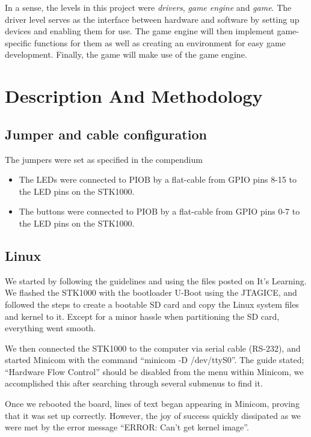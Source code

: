 \documentclass[a4paper,12pt]{article}
\begin{document}
In a sense, the levels in this project were \emph{drivers}, \emph{game engine} and \emph{game}. The driver level serves as the interface between hardware and software by setting up devices and enabling them for use. The game engine will then implement game-specific functions for them as well as creating an environment for easy game development. Finally, the game will make use of the game engine.

\clearpage
\section{Description And Methodology}

\subsection{Jumper and cable configuration} %
The jumpers were set as specified in the compendium\cite{compendium}

\begin{itemize}
\item The LEDs were connected to PIOB by a flat-cable from GPIO pins 8-15 to the LED pins on the STK1000. 
\item The buttons were connected to PIOB by a flat-cable from GPIO pins 0-7 to the LED pins on the STK1000.
\end{itemize}

\subsection{Linux} %

We started by following the guidelines and using the files posted on It’s Learning. We flashed the STK1000 with the bootloader U-Boot using the JTAGICE, and followed the steps to create a bootable SD card and copy the Linux system files and kernel to it. Except for a minor hassle when partitioning the SD card, everything went smooth.

We then connected the STK1000 to the computer via serial cable (RS-232), and started Minicom with the command “minicom -D /dev/ttyS0”. The guide stated; “Hardware Flow Control” should be disabled from the menu within Minicom, we accomplished this after searching through several submenus to find it.

Once we rebooted the board, lines of text began appearing in Minicom, proving that it was set up correctly. However, the joy of success quickly dissipated as we were met by the error message “ERROR: Can’t get kernel image”.
\end{document}

